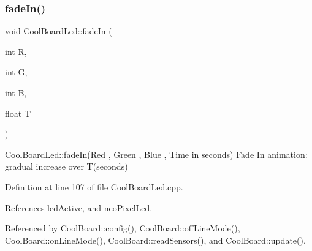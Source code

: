 \subsubsection{\texorpdfstring{fade\+In()}{fadeIn()}}
{\footnotesize\ttfamily void Cool\+Board\+Led\+::fade\+In (\begin{DoxyParamCaption}\item[{int}]{R,  }\item[{int}]{G,  }\item[{int}]{B,  }\item[{float}]{T }\end{DoxyParamCaption})}

Cool\+Board\+Led\+::fade\+In(\+Red , Green , Blue , Time in seconds) Fade In animation\+: gradual increase over T(seconds) 

Definition at line 107 of file Cool\+Board\+Led.\+cpp.



References led\+Active, and neo\+Pixel\+Led.



Referenced by Cool\+Board\+::config(), Cool\+Board\+::off\+Line\+Mode(), Cool\+Board\+::on\+Line\+Mode(), Cool\+Board\+::read\+Sensors(), and Cool\+Board\+::update().


